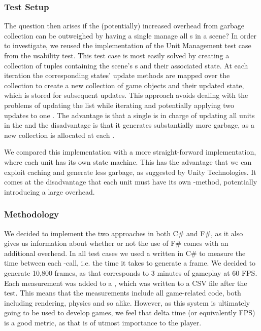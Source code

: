 \subsubsection{Test Setup}
The question then arises if the (potentially) increased overhead from garbage collection can be outweighed by having a single  manage all s in a scene? In order to investigate, we reused the implementation of the Unit Management test case from the usability test. This test case is most easily solved by creating a collection of tuples containing the scene's s and their associated state. At each iteration the corresponding states' update methods are mapped over the collection to create a new collection of game objects and their updated state, which is stored for subsequent updates. This approach avoids dealing with the problems of updating the list while iterating and potentially applying two updates to one . The advantage is that a single  is in charge of updating all units in the  and the disadvantage is that it generates substantially more garbage, as a new collection is allocated at each .

We compared this implementation with a more straight-forward implementation, where each unit has its own state machine. This has the advantage that we can exploit caching and generate less garbage, as suggested by Unity Technologies\cite{unity:optimisation}. It comes at the disadvantage that each unit must have its own -method, potentially introducing a large overhead\cite{unity:runtime:calls}.

\subsubsection{Methodology}
We decided to implement the two approaches in both C\# and F\#, as it also gives us information about whether or not the use of F\# comes with an additional overhead. In all test cases we used a  written in C\# to measure the time between each -call, i.e. the time it takes to generate a frame. We decided to generate 10,800 frames, as that corresponds to 3 minutes of gameplay at 60 \gls{FPS}. Each measurement was added to a , which was written to a CSV file after the test. This means that the measurements include all game-related code, both including rendering, physics and so alike. However, as this system is ultimately going to be used to develop games, we feel that delta time (or equivalently \gls{FPS}) is a good metric, as that is of utmost importance to the player.  